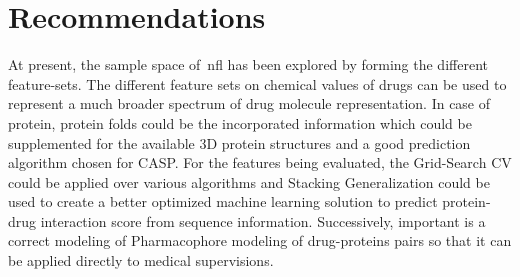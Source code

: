 \section{Recommendations}

At present, the sample space of~\acrfull{nfl} has been explored by forming the different feature-sets. The different feature sets on chemical values of drugs can be used to represent a much broader spectrum of drug molecule representation. In case of protein, protein folds could be the incorporated information which could be supplemented for the available 3D protein structures and a good prediction algorithm chosen for CASP\citep{CASP82008}. For the features being evaluated, the Grid-Search CV could be applied over various algorithms and Stacking Generalization could be used to create a better optimized machine learning solution to predict protein-drug interaction score from sequence information. Successively, important is a correct modeling of Pharmacophore modeling of drug-proteins pairs so that it can be applied directly to medical supervisions. 